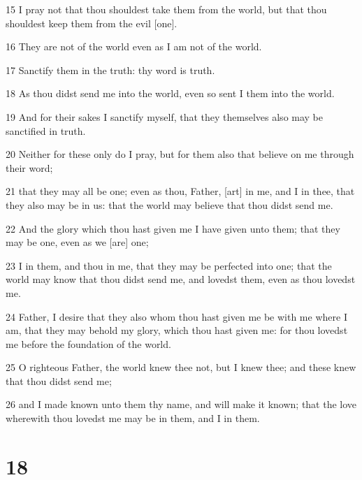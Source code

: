 \par 15 I pray not that thou shouldest take them from the world, but that thou shouldest keep them from the evil [one].
\par 16 They are not of the world even as I am not of the world.
\par 17 Sanctify them in the truth: thy word is truth.
\par 18 As thou didst send me into the world, even so sent I them into the world.
\par 19 And for their sakes I sanctify myself, that they themselves also may be sanctified in truth.
\par 20 Neither for these only do I pray, but for them also that believe on me through their word;
\par 21 that they may all be one; even as thou, Father, [art] in me, and I in thee, that they also may be in us: that the world may believe that thou didst send me.
\par 22 And the glory which thou hast given me I have given unto them; that they may be one, even as we [are] one;
\par 23 I in them, and thou in me, that they may be perfected into one; that the world may know that thou didst send me, and lovedst them, even as thou lovedst me.
\par 24 Father, I desire that they also whom thou hast given me be with me where I am, that they may behold my glory, which thou hast given me: for thou lovedst me before the foundation of the world.
\par 25 O righteous Father, the world knew thee not, but I knew thee; and these knew that thou didst send me;
\par 26 and I made known unto them thy name, and will make it known; that the love wherewith thou lovedst me may be in them, and I in them.

\chapter{18}

